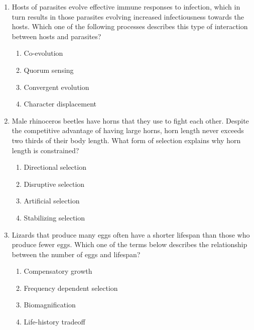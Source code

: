 \documentclass[journal]{IEEEtran}
\begin{document}
\begin{enumerate}
    \item Hosts of parasites evolve effective immune responses to infection, which in turn results in those parasites evolving increased infectiousness towards the hosts.
Which one of the following processes describes this type of interaction between hosts and parasites?
\begin{multicols}{2}
    \begin{enumerate}
        \item Co-evolution
        \item Quorum sensing
        \item Convergent evolution
        \item Character displacement
    \end{enumerate}
    \end{multicols}

    \item Male rhinoceros beetles have horns that they use to fight each other.
Despite the competitive advantage of having large horns, horn length never exceeds two thirds of their body length.
What form of selection explains why horn length is constrained?
\begin{multicols}{2}
    \begin{enumerate}
        \item Directional selection
        \item Disruptive selection
        \item Artificial selection
        \item Stabilizing selection
    \end{enumerate}
    \end{multicols}

    \item Lizards that produce many eggs often have a shorter lifespan than those who produce fewer eggs.
Which one of the terms below describes the relationship between the number of eggs and lifespan?
\begin{multicols}{2}
    \begin{enumerate}
        \item Compensatory growth
        \item Frequency dependent selection
        \item Biomagnification
        \item Life-history tradeoff
    \end{enumerate}
    \end{multicols}


\end{enumerate}
\end{document}
